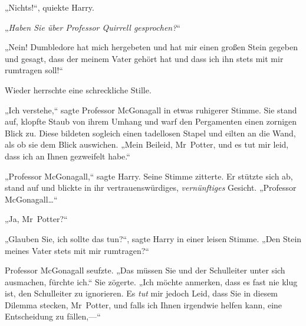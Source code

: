 „Nichts!“, quiekte Harry.

„\emph{Haben Sie über Professor Quirrell gesprochen?}“

„Nein! Dumbledore hat mich hergebeten und hat mir einen großen Stein gegeben und gesagt, dass der meinem Vater gehört hat und dass ich ihn stets mit mir rumtragen soll!“

Wieder herrschte eine schreckliche Stille.

„Ich verstehe,“ sagte Professor McGonagall in etwas ruhigerer Stimme. Sie stand auf, klopfte Staub von ihrem Umhang und warf den Pergamenten einen zornigen Blick zu. Diese bildeten sogleich einen tadellosen Stapel und eilten an die Wand, als ob sie dem Blick auswichen. „Mein Beileid, Mr~Potter, und es tut mir leid, dass ich an Ihnen gezweifelt habe.“

„Professor McGonagall,“ sagte Harry. Seine Stimme zitterte. Er stützte sich ab, stand auf und blickte in ihr vertrauenswürdiges, \emph{vernünftiges} Gesicht. „Professor McGonagall…“

„Ja, Mr~Potter?“

„Glauben Sie, ich sollte das tun?“, sagte Harry in einer leisen Stimme. „Den Stein meines Vater stets mit mir rumtragen?“

Professor McGonagall seufzte. „Das müssen Sie und der Schulleiter unter sich ausmachen, fürchte ich.“ Sie zögerte. „Ich möchte anmerken, dass es fast nie klug ist, den Schulleiter zu ignorieren. Es \emph{tut} mir jedoch Leid, dass Sie in diesem Dilemma stecken, Mr~Potter, und falls ich Ihnen irgendwie helfen kann, eine Entscheidung zu fällen,—“

